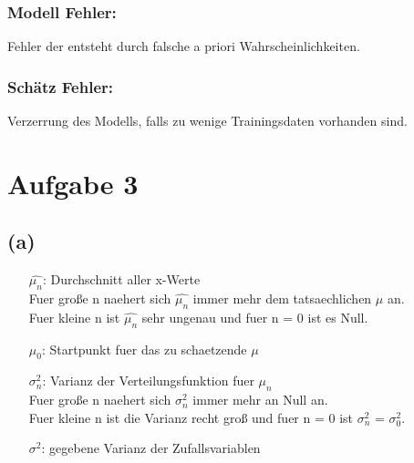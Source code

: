 \documentclass[a4paper]{scrartcl}
\begin{document}
\subsubsection*{Modell Fehler:}
Fehler der entsteht durch falsche a priori Wahrscheinlichkeiten.
\subsubsection*{Schätz Fehler:}
Verzerrung des Modells, falls zu wenige Trainingsdaten vorhanden sind.

\section*{Aufgabe 3}

\subsection*{(a)}

\begin{itemize}
	\item[$\widehat{\mu_n}$:] Durchschnitt aller x-Werte\\
	Fuer große n naehert sich $\widehat{\mu_n}$ immer mehr dem tatsaechlichen $\mu$ an.\\
	Fuer kleine n ist $\widehat{\mu_n}$ sehr ungenau und fuer n = 0 ist es Null.\\
	\item[$\mu_0$:] Startpunkt fuer das zu schaetzende $\mu$
	\item[$\sigma_n^2$:] Varianz der Verteilungsfunktion fuer $\mu_n$\\
	Fuer große n naehert sich $\sigma_n^2$ immer mehr an Null an.\\
	Fuer kleine n ist die Varianz recht groß und fuer n = 0 ist $\sigma_n^2$ = $\sigma_0^2$. 
	\item[$\sigma^2$:] gegebene Varianz der Zufallsvariablen 
\end{itemize}
\end{document}
